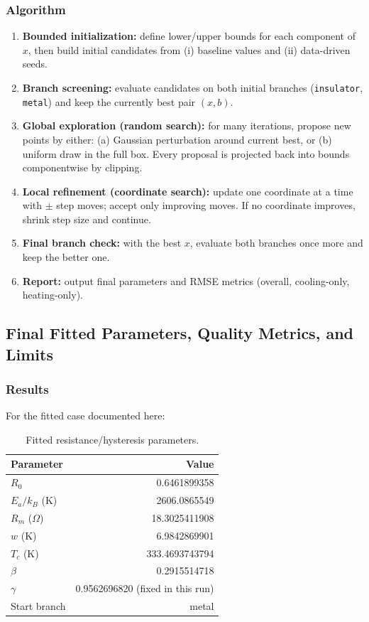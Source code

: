 \documentclass[11pt]{article}
\begin{document}
\subsubsection*{Algorithm}
\begin{enumerate}
    \item \textbf{Bounded initialization:} define lower/upper bounds for each component of \(x\), then build initial candidates from (i) baseline values and (ii) data-driven seeds.
    \item \textbf{Branch screening:} evaluate candidates on both initial branches (\texttt{insulator}, \texttt{metal}) and keep the currently best pair \((x,b)\).
    \item \textbf{Global exploration (random search):} for many iterations, propose new points by either:
    (a) Gaussian perturbation around current best, or
    (b) uniform draw in the full box.
    Every proposal is projected back into bounds componentwise by clipping.
    \item \textbf{Local refinement (coordinate search):} update one coordinate at a time with \(\pm\) step moves; accept only improving moves. If no coordinate improves, shrink step size and continue.
    \item \textbf{Final branch check:} with the best \(x\), evaluate both branches once more and keep the better one.
    \item \textbf{Report:} output final parameters and RMSE metrics (overall, cooling-only, heating-only).
\end{enumerate}

\subsection{Final Fitted Parameters, Quality Metrics, and Limits}
\subsubsection*{Results}
For the fitted case documented here:

\begin{table}[htbp]
\centering
\small
\caption{Fitted resistance/hysteresis parameters.}
\label{tab:fit_final_params}
\begin{tabular}{lr}
\toprule
Parameter & Value \\
\midrule
\(R_0\) & 0.6461899358 \\
\(E_a/k_B\) (K) & 2606.0865549 \\
\(R_m\) (\(\Omega\)) & 18.3025411908 \\
\(w\) (K) & 6.9842869901 \\
\(T_c\) (K) & 333.4693743794 \\
\(\beta\) & 0.2915514718 \\
\(\gamma\) & 0.9562696820 (fixed in this run) \\
Start branch & metal \\
\bottomrule
\end{tabular}
\end{table}
\end{document}
